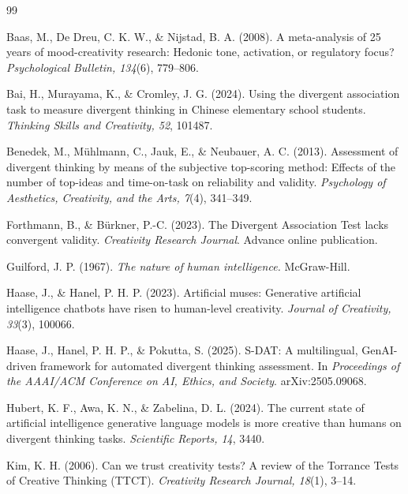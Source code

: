 \documentclass[12pt]{article}
\begin{document}
\begin{thebibliography}{99}

Baas, M., De Dreu, C. K. W., \& Nijstad, B. A. (2008). A meta-analysis of 25 years of mood-creativity research: Hedonic tone, activation, or regulatory focus? \textit{Psychological Bulletin, 134}(6), 779--806.

Bai, H., Murayama, K., \& Cromley, J. G. (2024). Using the divergent association task to measure divergent thinking in Chinese elementary school students. \textit{Thinking Skills and Creativity, 52}, 101487.

Benedek, M., M\"uhlmann, C., Jauk, E., \& Neubauer, A. C. (2013). Assessment of divergent thinking by means of the subjective top-scoring method: Effects of the number of top-ideas and time-on-task on reliability and validity. \textit{Psychology of Aesthetics, Creativity, and the Arts, 7}(4), 341--349.

Forthmann, B., \& B\"urkner, P.-C. (2023). The Divergent Association Test lacks convergent validity. \textit{Creativity Research Journal}. Advance online publication.

Guilford, J. P. (1967). \textit{The nature of human intelligence.} McGraw-Hill.

Haase, J., \& Hanel, P. H. P. (2023). Artificial muses: Generative artificial intelligence chatbots have risen to human-level creativity. \textit{Journal of Creativity, 33}(3), 100066.

Haase, J., Hanel, P. H. P., \& Pokutta, S. (2025). S-DAT: A multilingual, GenAI-driven framework for automated divergent thinking assessment. In \textit{Proceedings of the AAAI/ACM Conference on AI, Ethics, and Society}. arXiv:2505.09068.

Hubert, K. F., Awa, K. N., \& Zabelina, D. L. (2024). The current state of artificial intelligence generative language models is more creative than humans on divergent thinking tasks. \textit{Scientific Reports, 14}, 3440.

Kim, K. H. (2006). Can we trust creativity tests? A review of the Torrance Tests of Creative Thinking (TTCT). \textit{Creativity Research Journal, 18}(1), 3--14.


\end{thebibliography}
\end{document}
